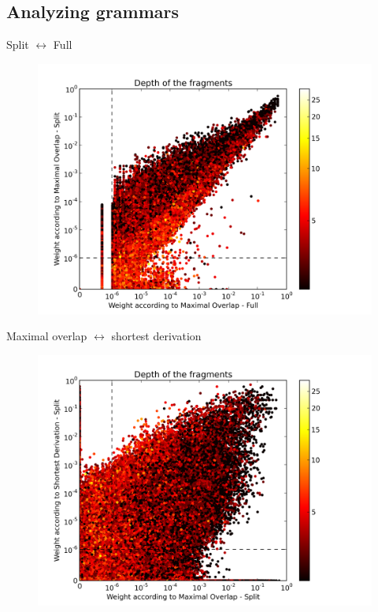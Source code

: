 \documentclass{beamer}
\begin{document}
\subsection{Analyzing grammars}


\begin{frame}{Split $\leftrightarrow$ Full}
\begin{figure}
\includegraphics[width=\textwidth,trim=0.5cm 0cm 2.5cm 0.5cm, clip=true]{../data/plots/2.png}
\end{figure}
\end{frame}


\begin{frame}{Maximal overlap $\leftrightarrow$ shortest derivation}

\begin{figure}
\includegraphics[width=\textwidth,trim=0.5cm 0cm 2.5cm 0.5cm, clip=true]{../data/plots/0.png}
\end{figure}
\end{frame}
\end{document}
